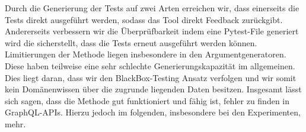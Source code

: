 Durch die Generierung der Tests auf zwei Arten erreichen wir, dass einerseits die Tests direkt ausgeführt werden, sodass das
Tool direkt Feedback zurückgibt. Andererseits verbessern wir die Überprüfbarkeit indem eine Pytest-File generiert wird die sicherstellt,
dass die Tests erneut ausgeführt werden können.
Limitierungen der Methode liegen insbesondere in den Argumentgeneratoren.
Diese haben teilweise eine sehr schlechte Generierungskapazität im allgemeinen.
Dies liegt daran, dass wir den BlackBox-Testing Ansatz verfolgen und wir somit kein Domänenwissen über die zugrunde liegenden Daten besitzen.
Insgesamt lässt sich sagen, dass die Methode gut funktioniert und fähig ist, fehler zu finden in GraphQL-APIs.
Hierzu jedoch im folgenden, insbesondere bei den Experimenten, mehr.